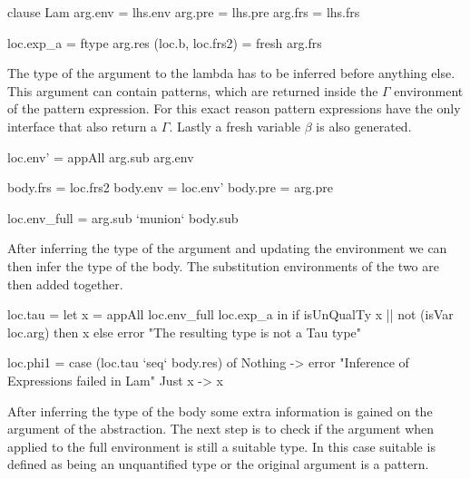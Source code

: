 \begin{code}
clause Lam
    arg.env = lhs.env
    arg.pre = lhs.pre
    arg.frs = lhs.frs
   
    loc.exp_a = ftype arg.res
    (loc.b, loc.frs2) = fresh arg.frs
\end{code}
The type of the argument to the lambda has to be inferred before anything else. This argument can contain patterns, which are returned inside the $\Gamma$ environment of the pattern expression. For this exact reason pattern expressions have the only interface that also return a $\Gamma$. Lastly a fresh variable $\beta$ is also generated.
       
\begin{code}
loc.env'          = appAll arg.sub arg.env
   
body.frs = loc.frs2
body.env = loc.env'
body.pre = arg.pre
    
loc.env_full = arg.sub `munion` body.sub
\end{code}
After inferring the type of the argument and updating the environment we can then infer the type of the body. The substitution environments of the two are then added together.     

\begin{code}
loc.tau = let x = appAll loc.env_full loc.exp_a
          in if isUnQualTy x || not (isVar loc.arg)
                then x
                else error "The resulting type is not a Tau type"
                    
loc.phi1 = case (loc.tau `seq` body.res) of
             Nothing -> error "Inference of Expressions failed in Lam"
             Just x  -> x
\end{code}
After inferring the type of the body some extra information is gained on the argument of the abstraction. The next step is to check if the argument when applied to the full environment is still a suitable type. In this case suitable is defined as being an unquantified type or the original argument is a pattern.

